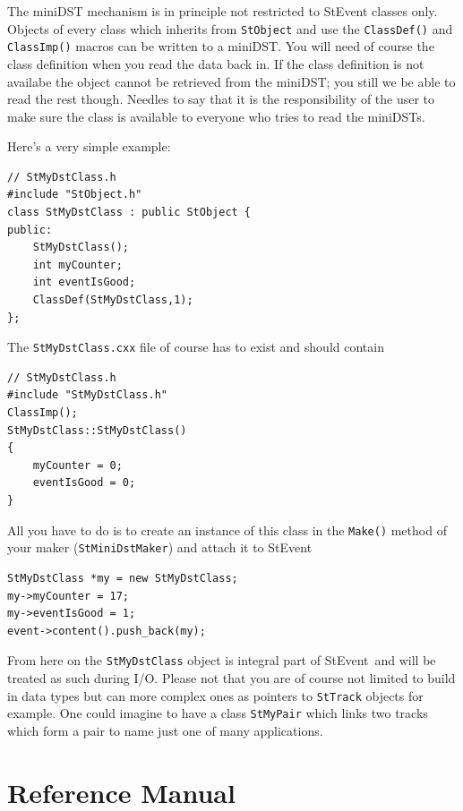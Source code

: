\documentclass[twoside]{article}
\newcommand{\StEvent}{\textsf{StEvent}}
\begin{document}
The miniDST mechanism is in principle not restricted to StEvent
classes only.  Objects of every class which inherits from
\texttt{StObject} and use the \texttt{ClassDef()} and
\texttt{ClassImp()} macros can be written to a miniDST. You
will need of course the class definition when you read the data back
in. If the class definition is not availabe the object cannot be
retrieved from the miniDST; you still we be able to read the rest though.
Needles to say that it is the responsibility of the user to
make sure the class is available to everyone who tries to read the
miniDSTs.

Here's a very simple example:
\begin{verbatim}
// StMyDstClass.h
#include "StObject.h"
class StMyDstClass : public StObject {
public:
    StMyDstClass();
    int myCounter;
    int eventIsGood;
    ClassDef(StMyDstClass,1);
};
\end{verbatim}

The \texttt{StMyDstClass.cxx} file of course has to exist and should contain
\begin{verbatim}
// StMyDstClass.h
#include "StMyDstClass.h"
ClassImp();
StMyDstClass::StMyDstClass()
{
    myCounter = 0;
    eventIsGood = 0;
}
\end{verbatim}

All you have to do is to create an instance of this class in the \texttt{Make()} method
of your maker (\texttt{StMiniDstMaker}) and attach it to \StEvent\:

\begin{verbatim}
StMyDstClass *my = new StMyDstClass;
my->myCounter = 17;
my->eventIsGood = 1;
event->content().push_back(my);
\end{verbatim}

From here on the \texttt{StMyDstClass} object is integral part of \StEvent\ and
will be treated as such during I/O.
Please not that you are of course not limited to build in data types
but can more complex ones as pointers to \texttt{StTrack} objects for example.
One could imagine to have a class \texttt{StMyPair} which links two tracks which form
a pair to name just one of many applications. 

\clearpage

%
%
\part{Reference Manual}
\clearpage
\end{document}
